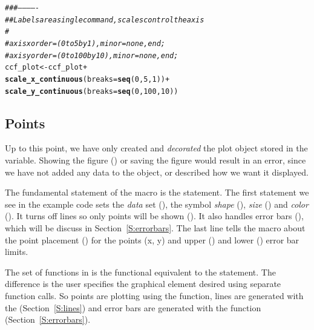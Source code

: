 \documentclass[nojss]{jss}\usepackage[]{graphicx}\usepackage[]{color}
\makeatletter
\newcommand{\hlnum}[1]{\textcolor[rgb]{0.686,0.059,0.569}{#1}}%
\newcommand{\hlcom}[1]{\textcolor[rgb]{0.678,0.584,0.686}{\textit{#1}}}%
\newcommand{\hlopt}[1]{\textcolor[rgb]{0,0,0}{#1}}%
\newcommand{\hlstd}[1]{\textcolor[rgb]{0.345,0.345,0.345}{#1}}%
\newcommand{\hlkwb}[1]{\textcolor[rgb]{0.69,0.353,0.396}{#1}}%
\newcommand{\hlkwc}[1]{\textcolor[rgb]{0.333,0.667,0.333}{#1}}%
\newcommand{\hlkwd}[1]{\textcolor[rgb]{0.737,0.353,0.396}{\textbf{#1}}}%
\newenvironment{kframe}{%
 \def\at@end@of@kframe{}%
 \ifinner\ifhmode%
  \def\at@end@of@kframe{\end{minipage}}%
  \begin{minipage}{\columnwidth}%
 \fi\fi%
 \def\FrameCommand##1{\hskip\@totalleftmargin \hskip-\fboxsep
 \colorbox{shadecolor}{##1}\hskip-\fboxsep
     \hskip-\linewidth \hskip-\@totalleftmargin \hskip\columnwidth}%
 \MakeFramed {\advance\hsize-\width
   \@totalleftmargin\z@ \linewidth\hsize
   \@setminipage}}%
 {\par\unskip\endMakeFramed%
 \at@end@of@kframe}
\newenvironment{knitrout}{}{} %
\makeatother
\begin{document}
\begin{knitrout}\footnotesize
{}\color{fgcolor}\begin{kframe}
\begin{alltt}
\hlcom{###-------------}
\hlcom{## Labels are a single command, scales control the axis}
\hlcom{#}
\hlcom{#      axisx order=(0 to 5 by 1), minor=none, end;}
\hlcom{#      axisy order=(0 to 100 by 10), minor=none, end;}
\hlstd{ccf_plot} \hlkwb{<-} \hlstd{ccf_plot} \hlopt{+}
  \hlkwd{scale_x_continuous}\hlstd{(}\hlkwc{breaks}\hlstd{=}\hlkwd{seq}\hlstd{(}\hlnum{0}\hlstd{,}\hlnum{5}\hlstd{,}\hlnum{1}\hlstd{))}\hlopt{+}
  \hlkwd{scale_y_continuous}\hlstd{(}\hlkwc{breaks}\hlstd{=}\hlkwd{seq}\hlstd{(}\hlnum{0}\hlstd{,}\hlnum{100}\hlstd{,}\hlnum{10}\hlstd{))}
\end{alltt}
\end{kframe}
\end{knitrout}

\subsection{Points}\label{S:points}
Up to this point, we have only created and \emph{decorated} the plot object stored in the  variable. Showing the figure () or saving the figure would result in an error, since we have not added any data to the object, or described how we want it displayed. 

The fundamental statement of the  macro is the  statement. The first  statement we see in the example code sets the \emph{data} set (), the symbol \emph{shape} (), \emph{size} () and \emph{color} (). It turns off lines so only points will be shown (). It also handles error bars (), which will be discuss in Section~\ref{S:errorbars}. The last line tells the macro about the point placement () for the points (x, y) and upper () and lower () error bar limits. 

The  set of functions in  is the functional equivalent to the  statement. The difference is the user specifies the graphical element desired using separate function calls. So points are plotting using the  function, lines are generated with the  (Section~\ref{S:lines}) and error bars are generated with the  function (Section~\ref{S:errorbars}).
\end{document}
